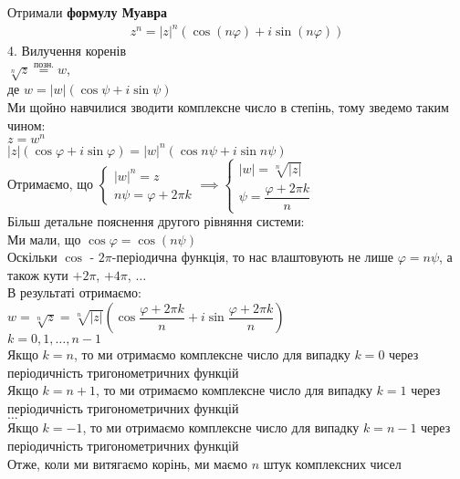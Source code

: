 \documentclass[a4paper, 14pt]{extarticle}
\theoremstyle{theoremdd}
\theoremstyle{theoremdd}
\theoremstyle{theoremdd}
\theoremstyle{theoremdd}
\theoremstyle{theoremdd}
\theoremstyle{theoremdd}
\theoremstyle{theoremdd}
\theoremstyle{theoremdd}
\begin{document}
Отримали \textbf{формулу Муавра}
\begin{align*}
z^n = |z|^n (\cos (n \varphi) + i \sin (n \varphi))
\end{align*}
4. Вилучення коренів\\
$\sqrt[n]{z} \overset{\textrm{позн.}}{=} w$,\\
де $w = |w|(\cos \psi + i \sin \psi)$\\
Ми щойно навчилися зводити комплексне число в степінь, тому зведемо таким чином:\\
$z = w^n$\\
$|z|(\cos \varphi + i \sin \varphi) = |w|^n (\cos n \psi + i \sin n \psi)$\\
Отримаємо, що $\begin{cases} |w|^n = z \\ n \psi = \varphi + 2 \pi k \end{cases} \implies \begin{cases} |w| = \sqrt[n]{|z|} \\ \psi = \dfrac{\varphi + 2\pi k}{n} \end{cases}$\\
Більш детальне пояснення другого рівняння системи:\\
Ми мали, що $\cos \varphi = \cos (n \psi)$\\
Оскільки $\cos$ - $2\pi$-періодична функція, то нас влаштовують не лише $\varphi = n \psi$, а також кути $+2\pi$, $+4\pi$, $\dots$\\
В результаті отримаємо:\\
$w = \sqrt[n]{z} = \sqrt[n]{|z|} \left(\cos \dfrac{\varphi + 2\pi k}{n} + i \sin \dfrac{\varphi + 2 \pi k}{n} \right)$\\
$k = 0,1,\dots,n-1$\\
Якщо $k = n$, то ми отримаємо комплексне число для випадку $k = 0$ через періодичність тригонометричних функцій\\
Якщо $k = n+1$, то ми отримаємо комплексне число для випадку $k = 1$ через періодичність тригонометричних функцій\\
$\dots$\\
Якщо $k = -1$, то ми отримаємо комплексне число для випадку $k = n-1$ через періодичність тригонометричних функцій\\
Отже, коли ми витягаємо корінь, ми маємо $n$ штук комплексних чисел
\end{document}
